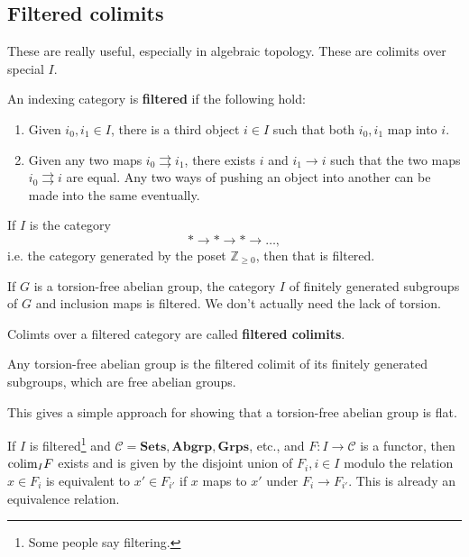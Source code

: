 \subsection{Filtered colimits}

These are really useful, especially in algebraic topology. These are colimits
over special $I$.

\begin{definition} An indexing category is \textbf{filtered} if the following
hold: \begin{enumerate} \item Given $i_0, i_1 \in I$, there is a third object
$i \in I$ such that both $i_0, i_1$ map into $i$. \item Given any two maps
$i_0 \rightrightarrows i_1$, there exists $i$ and $i_1 \to i$ such that the
two maps $i_0 \rightrightarrows i$ are equal. Any two ways of pushing an
object into another can be made into the same eventually. \end{enumerate}
\end{definition}

\begin{example} If $I$ is the category \[ \ast \to \ast \to \ast \to \dots, \]
i.e. the category generated by the poset $\mathbb{Z}_{\geq 0}$, then that is
filtered. \end{example}

\begin{example} If $G$ is a torsion-free abelian group, the category $I$ of
finitely generated subgroups of $G$ and inclusion maps is filtered. We don't
actually need the lack of torsion. \end{example}

\begin{definition} Colimts over a filtered category are called
\textbf{filtered colimits}. \end{definition}

\begin{example} Any torsion-free abelian group is the filtered colimit of its
finitely generated subgroups, which are free abelian groups. \end{example}
This gives a simple approach for showing that a torsion-free abelian group is
flat.

\begin{proposition} If $I$ is filtered\footnote{Some people say filtering.}
and $\mathcal{C} = \mathbf{Sets}, \mathbf{Abgrp}, \mathbf{Grps}$, etc., and
$F: I \to \mathcal{C}$ is a functor, then $\mathrm{colim}_I F$ exists and is given by
the disjoint union of $F_i, i \in I$ modulo the relation $x \in F_i$ is
equivalent to $x' \in F_{i'}$ if $x$ maps to $x'$ under $F_i \to F_{i'}$. This
is already an equivalence relation. \end{proposition}

